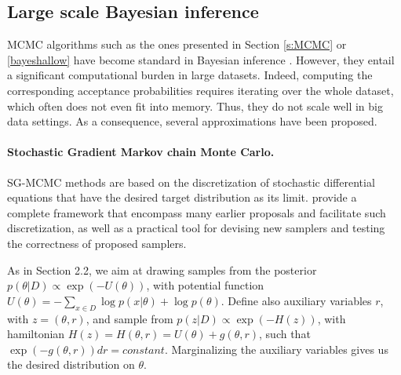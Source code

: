 \subsection{Large scale Bayesian inference}


MCMC algorithms such as the ones presented in Section \ref{s:MCMC} or \ref{bayeshallow} 
have become standard in Bayesian inference \cite{french}.
However, they entail a significant computational burden in large datasets. Indeed, 
computing the corresponding acceptance probabilities 
 requires iterating over the whole dataset, which often does not even
 fit into memory. Thus, they 
  do not scale well in big data settings. 
 As a consequence, several approximations have been proposed.

\paragraph{Stochastic Gradient Markov chain Monte Carlo.}\label{bayesdeep} 

SG-MCMC methods are based on the discretization of 
stochastic differential equations that have the desired target 
distribution as its limit. \cite{ma2015complete} provide a
complete framework that encompass many earlier proposals and
facilitate such discretization, as well as a practical tool for
devising new samplers and testing the correctness of proposed samplers.

As in Section 2.2, we aim at drawing samples from the
posterior $p(\theta |D) \propto \exp(-U(\theta ))$,
with potential function
$U(\theta ) = -\sum _{x\in D} \log p(x|\theta ) + \log p(\theta )$. Define also auxiliary variables $r$,
with $z=( \theta, r )$, and sample from $p(z|D) \propto  \exp(-H(z))$, with hamiltonian
$H(z) = H(\theta , r) = U(\theta ) + g(\theta , r)$, such that
$\exp(-g(\theta , r))dr = constant$. 
Marginalizing the auxiliary variables gives us the desired distribution on $\theta $.


